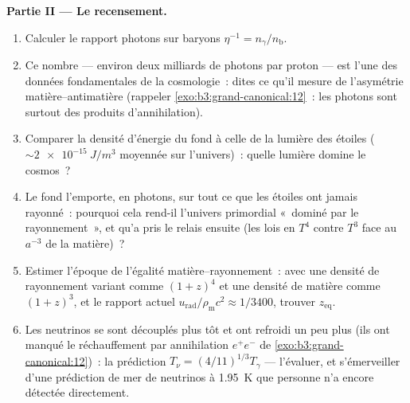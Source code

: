 \begin{problem}
\medskip\noindent\textbf{Partie II --- Le recensement.}
\begin{enumerate}[resume]
  \item Calculer le rapport photons sur baryons $\eta^{-1} =
        n_\gamma/n_{\text{b}}$.
  \item Ce nombre --- environ deux milliards de photons par proton
        --- est l'une des données fondamentales de la cosmologie~:
        dites ce qu'il mesure de l'asymétrie matière--antimatière
        (rappeler \cref{exo:b3:grand-canonical:12}~: les photons
        sont surtout des produits d'annihilation).
  \item Comparer la densité d'énergie du fond à celle de la lumière
        des étoiles ($\sim\qty{2e-15}{J/m^3}$ moyennée sur
        l'univers)~: quelle lumière domine le cosmos~?
  \item Le fond l'emporte, en photons, sur tout ce que les étoiles
        ont jamais rayonné~: pourquoi cela rend-il l'univers
        primordial «~dominé par le rayonnement~», et qu'a pris le
        relais ensuite (les lois en $T^4$ contre $T^3$ face au
        $a^{-3}$ de la matière)~?
  \item Estimer l'époque de l'égalité matière--rayonnement~: avec
        une densité de rayonnement variant comme $(1+z)^4$ et une
        densité de matière comme $(1+z)^3$, et le rapport actuel
        $u_{\text{rad}}/\rho_{\text{m}}c^2 \approx 1/3400$,
        trouver $z_{\text{eq}}$.
  \item Les neutrinos se sont découplés plus tôt et ont refroidi un
        peu plus (ils ont manqué le réchauffement par annihilation
        $e^+e^-$ de \cref{exo:b3:grand-canonical:12})~: la
        prédiction $T_\nu = (4/11)^{1/3}T_\gamma$ --- l'évaluer,
        et s'émerveiller d'une prédiction de mer de neutrinos à
        \qty{1.95}{K} que personne n'a encore détectée directement.
\end{enumerate}


\end{problem}
